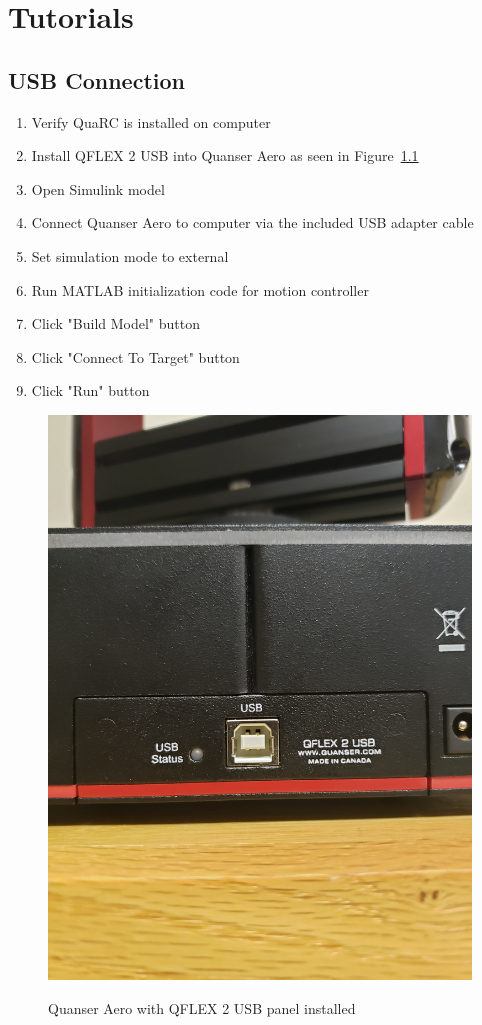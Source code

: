 \chapter{Tutorials}

\section{USB Connection}
\begin{enumerate}
    \item Verify QuaRC is installed on computer
    \item Install QFLEX 2 USB into Quanser Aero as seen in Figure~\ref{fig:USB_Panel}
    \item Open Simulink model
    \item Connect Quanser Aero to computer via the included USB adapter cable
    \item Set simulation mode to external
    \item Run MATLAB initialization code for motion controller
    \item Click "Build Model" button
    \item Click "Connect To Target" button
    \item Click "Run" button
\end{enumerate}

\begin{figure}[!h]
    \centering
    \includegraphics[angle = 270,width=.248\textwidth,keepaspectratio=true]{figs/img/USB_Panel.jpg}
    \label{fig:USB_Panel}
    \caption{Quanser Aero with QFLEX 2 USB panel installed}
\end{figure}
